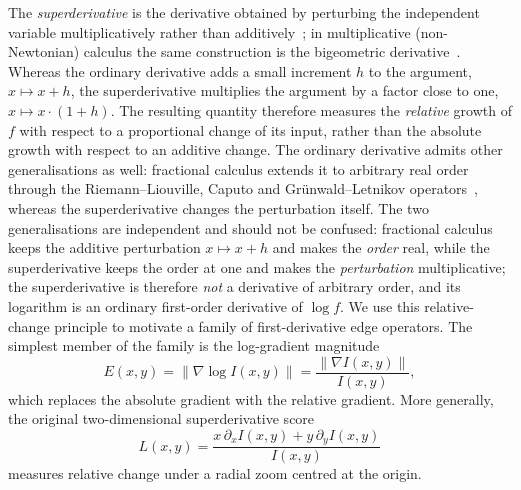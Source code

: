 \documentclass[conference]{IEEEtran}
\begin{document}
The \emph{superderivative} is the derivative obtained by perturbing the
independent variable multiplicatively rather than
additively~\cite{zotkin}; in multiplicative (non-Newtonian) calculus the same
construction is the bigeometric derivative~\cite{grossman}.  Whereas the
ordinary derivative adds a small increment $h$ to the argument, $x\mapsto x+h$,
the superderivative multiplies the argument by a factor close to one,
$x\mapsto x\cdot(1+h)$.  The resulting quantity therefore measures the
\emph{relative} growth of $f$ with respect to a proportional change of its
input, rather than the absolute growth with respect to an additive change.
The ordinary derivative admits other generalisations as well: fractional calculus
extends it to arbitrary real order through the Riemann--Liouville, Caputo and
Gr\"unwald--Letnikov operators~\cite{samko1993,kilbas2006,miller1993}, whereas
the superderivative changes the perturbation itself. The two generalisations are
independent and should not be confused: fractional calculus keeps the additive
perturbation $x\mapsto x+h$ and makes the \emph{order} real, while the
superderivative keeps the order at one and makes the \emph{perturbation}
multiplicative; the superderivative is therefore \emph{not} a derivative of
arbitrary order, and its logarithm is an ordinary first-order derivative of
$\log f$.
We use this relative-change principle to motivate a family of first-derivative
edge operators.  The simplest member of the family is the
log-gradient magnitude
\begin{equation}
E(x,y)=\|\nabla\log I(x,y)\|=\frac{\|\nabla I(x,y)\|}{I(x,y)},
\label{eq:loggrad}
\end{equation}
which replaces the absolute gradient with the relative gradient.  More
generally, the original two-dimensional superderivative score
\begin{equation}
L(x,y)=\frac{x\,\partial_x I(x,y)+y\,\partial_y I(x,y)}{I(x,y)}
\label{eq:L}
\end{equation}
measures relative change under a radial zoom centred at the origin.
\end{document}
